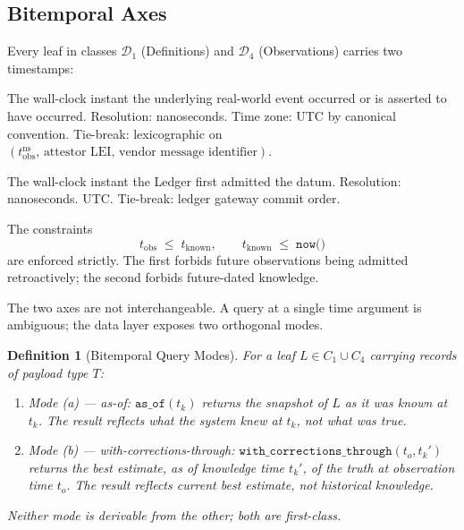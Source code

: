 \documentclass[11pt,a4paper]{article}
\newtheorem{definition}{Definition}[section]
\begin{document}
\subsection{Bitemporal Axes}
\label{sec:notation-bitemporal}

Every leaf in classes $\mathcal{D}_1$ (Definitions) and $\mathcal{D}_4$ (Observations) carries two timestamps:

\begin{description}[style=nextline]
\item[$t_{\mathrm{obs}} \in \mathrm{ObsTime}$] The wall-clock instant the underlying real-world event occurred or is asserted to have occurred. Resolution: nanoseconds. Time zone: UTC by canonical convention. Tie-break: lexicographic on $(t_{\mathrm{obs}}^{\mathrm{ns}},\, \text{attestor LEI},\, \text{vendor message identifier})$.
\item[$t_{\mathrm{known}} \in \mathrm{KnownTime}$] The wall-clock instant the Ledger first admitted the datum. Resolution: nanoseconds. UTC. Tie-break: ledger gateway commit order.
\end{description}

The constraints
\[
t_{\mathrm{obs}} \;\le\; t_{\mathrm{known}}, \qquad t_{\mathrm{known}} \;\le\; \texttt{now()}
\]
are enforced strictly. The first forbids future observations being admitted retroactively; the second forbids future-dated knowledge.

The two axes are not interchangeable. A query at a single time argument is ambiguous; the data layer exposes two orthogonal modes.

\begin{definition}[Bitemporal Query Modes]
\label{def:bitemporal-modes}
For a leaf $L \in C_1 \cup C_4$ carrying records of payload type $T$:
\begin{enumerate}[nosep]
\item \emph{Mode (a) --- as-of}: $\texttt{as\_of}(t_k)$ returns the snapshot of $L$ as it was known at $t_k$. The result reflects what the system knew at $t_k$, not what was true.
\item \emph{Mode (b) --- with-corrections-through}: $\texttt{with\_corrections\_through}(t_o, t_k')$ returns the best estimate, as of knowledge time $t_k'$, of the truth at observation time $t_o$. The result reflects current best estimate, not historical knowledge.
\end{enumerate}
Neither mode is derivable from the other; both are first-class.
\end{definition}
\end{document}
